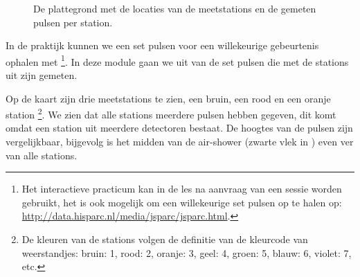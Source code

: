 \begin{figure}[ht]
    \centering
    \caption{De plattegrond met de locaties van de meetstations
             en de gemeten pulsen per station.}
    \label{fig:coincidence}
\end{figure}

In de praktijk kunnen we een set pulsen voor een willekeurige
gebeurtenis ophalen met \jsparc%
\footnote{Het interactieve practicum \jsparc kan in de les na aanvraag
van een sessie worden gebruikt, het is ook mogelijk om een willekeurige
set pulsen op te halen op:
\url{http://data.hisparc.nl/media/jsparc/jsparc.html}.%
}. In deze module gaan we uit van de set pulsen die met de stations
uit  zijn gemeten.

Op de kaart zijn drie meetstations te zien, een bruin, een rood en een
oranje station%
\footnote{De kleuren van de stations volgen de definitie van de
kleurcode van weerstandjes: bruin: 1, rood: 2, oranje: 3, geel: 4,
groen: 5, blauw: 6, violet: 7, etc. %
}. We zien dat alle stations meerdere pulsen hebben gegeven, dit komt
omdat een station uit meerdere detectoren bestaat. De hoogtes van de
pulsen zijn vergelijkbaar, bijgevolg is het midden van de air-shower
(zwarte vlek in ) even ver van alle stations. 


